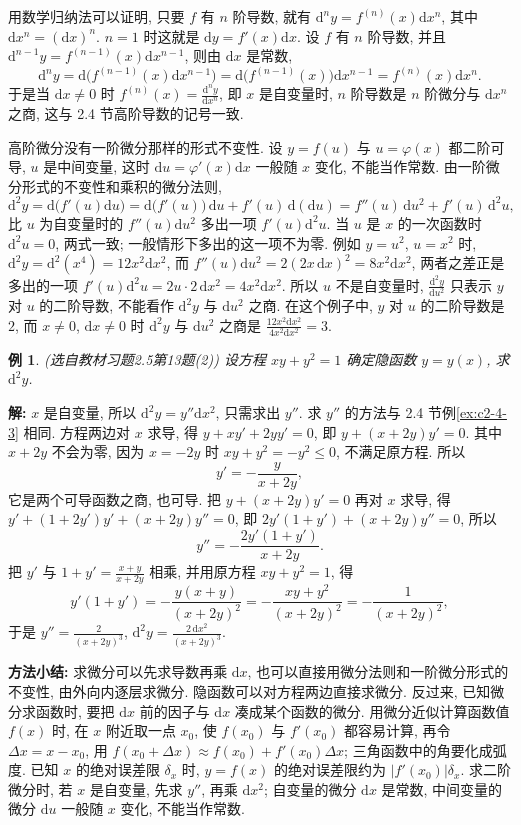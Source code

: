 \documentclass[UTF8,openany]{ctexbook}
\theoremstyle{chinesetextbook}
\newtheorem{example}{例}[section]
\newenvironment{cnsolution}{\par\indent\textbf{解:} \ignorespaces}{\par}
\newcommand{\dd}{\mathrm d}
\begin{document}
用数学归纳法可以证明, 只要 $f$ 有 $n$ 阶导数, 就有 $\dd^ny=f^{(n)}(x)\dd x^n$, 其中 $\dd x^n=(\dd x)^n$. $n=1$ 时这就是 $\dd y=f'(x)\dd x$. 设 $f$ 有 $n$ 阶导数, 并且 $\dd^{n-1}y=f^{(n-1)}(x)\dd x^{n-1}$, 则由 $\dd x$ 是常数,
\[
\dd^ny=\dd\bigl(f^{(n-1)}(x)\dd x^{n-1}\bigr)=\dd\bigl(f^{(n-1)}(x)\bigr)\dd x^{n-1}=f^{(n)}(x)\dd x^n.
\]
于是当 $\dd x\ne0$ 时 $\displaystyle f^{(n)}(x)=\frac{\dd^ny}{\dd x^n}$, 即 $x$ 是自变量时, $n$ 阶导数是 $n$ 阶微分与 $\dd x^n$ 之商, 这与 2.4 节高阶导数的记号一致.

高阶微分没有一阶微分那样的形式不变性. 设 $y=f(u)$ 与 $u=\varphi(x)$ 都二阶可导, $u$ 是中间变量, 这时 $\dd u=\varphi'(x)\dd x$ 一般随 $x$ 变化, 不能当作常数. 由一阶微分形式的不变性和乘积的微分法则,
\[
\dd^2y=\dd\bigl(f'(u)\dd u\bigr)=\dd\bigl(f'(u)\bigr)\,\dd u+f'(u)\,\dd(\dd u)=f''(u)\,\dd u^2+f'(u)\,\dd^2u,
\]
比 $u$ 为自变量时的 $f''(u)\dd u^2$ 多出一项 $f'(u)\dd^2u$. 当 $u$ 是 $x$ 的一次函数时 $\dd^2u=0$, 两式一致; 一般情形下多出的这一项不为零. 例如 $y=u^2$, $u=x^2$ 时, $\dd^2y=\dd^2(x^4)=12x^2\dd x^2$, 而 $f''(u)\dd u^2=2(2x\,\dd x)^2=8x^2\dd x^2$, 两者之差正是多出的一项 $f'(u)\dd^2u=2u\cdot2\,\dd x^2=4x^2\dd x^2$. 所以 $u$ 不是自变量时, $\displaystyle\frac{\dd^2y}{\dd u^2}$ 只表示 $y$ 对 $u$ 的二阶导数, 不能看作 $\dd^2y$ 与 $\dd u^2$ 之商. 在这个例子中, $y$ 对 $u$ 的二阶导数是 $2$, 而 $x\ne0$, $\dd x\ne0$ 时 $\dd^2y$ 与 $\dd u^2$ 之商是 $\displaystyle\frac{12x^2\dd x^2}{4x^2\dd x^2}=3$.
\begin{example}\label{ex:c2-h5-13}
\textnormal{(选自教材习题2.5第13题(2))} 设方程 $xy+y^2=1$ 确定隐函数 $y=y(x)$, 求 $\dd^2y$.
\end{example}
\begin{cnsolution}
$x$ 是自变量, 所以 $\dd^2y=y''\dd x^2$, 只需求出 $y''$. 求 $y''$ 的方法与 2.4 节例\ref{ex:c2-4-3} 相同. 方程两边对 $x$ 求导, 得 $y+xy'+2yy'=0$, 即 $y+(x+2y)y'=0$. 其中 $x+2y$ 不会为零, 因为 $x=-2y$ 时 $xy+y^2=-y^2\le0$, 不满足原方程. 所以
\[
y'=-\frac y{x+2y},
\]
它是两个可导函数之商, 也可导. 把 $y+(x+2y)y'=0$ 再对 $x$ 求导, 得 $y'+(1+2y')y'+(x+2y)y''=0$, 即 $2y'(1+y')+(x+2y)y''=0$, 所以
\[
y''=-\frac{2y'(1+y')}{x+2y}.
\]
把 $y'$ 与 $\displaystyle1+y'=\frac{x+y}{x+2y}$ 相乘, 并用原方程 $xy+y^2=1$, 得
\[
y'(1+y')=-\frac{y(x+y)}{(x+2y)^2}=-\frac{xy+y^2}{(x+2y)^2}=-\frac1{(x+2y)^2},
\]
于是 $\displaystyle y''=\frac2{(x+2y)^3}$, $\displaystyle\dd^2y=\frac{2\,\dd x^2}{(x+2y)^3}$.
\end{cnsolution}
\par\indent\textbf{方法小结:} 求微分可以先求导数再乘 $\dd x$, 也可以直接用微分法则和一阶微分形式的不变性, 由外向内逐层求微分. 隐函数可以对方程两边直接求微分. 反过来, 已知微分求函数时, 要把 $\dd x$ 前的因子与 $\dd x$ 凑成某个函数的微分. 用微分近似计算函数值 $f(x)$ 时, 在 $x$ 附近取一点 $x_0$, 使 $f(x_0)$ 与 $f'(x_0)$ 都容易计算, 再令 $\Delta x=x-x_0$, 用 $f(x_0+\Delta x)\approx f(x_0)+f'(x_0)\Delta x$; 三角函数中的角要化成弧度. 已知 $x$ 的绝对误差限 $\delta_x$ 时, $y=f(x)$ 的绝对误差限约为 $|f'(x_0)|\delta_x$. 求二阶微分时, 若 $x$ 是自变量, 先求 $y''$, 再乘 $\dd x^2$; 自变量的微分 $\dd x$ 是常数, 中间变量的微分 $\dd u$ 一般随 $x$ 变化, 不能当作常数.
\end{document}
